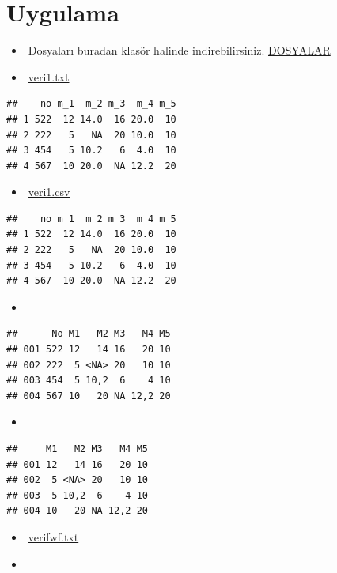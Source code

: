 \documentclass[
  oneside]{book}
\providecommand{\tightlist}{%
  \setlength{\itemsep}{0pt}\setlength{\parskip}{0pt}}
\begin{document}
\hypertarget{uygulama}{%
\section{Uygulama}\label{uygulama}}

\begin{itemize}
\item
  🔗Dosyaları buradan klasör halinde indirebilirsiniz. \href{import/import.rar}{DOSYALAR}
\item
  🔗\href{import/veri1.txt}{veri1.txt}
\end{itemize}

\begin{verbatim}
##    no m_1  m_2 m_3  m_4 m_5
## 1 522  12 14.0  16 20.0  10
## 2 222   5   NA  20 10.0  10
## 3 454   5 10.2   6  4.0  10
## 4 567  10 20.0  NA 12.2  20
\end{verbatim}

\begin{itemize}
\tightlist
\item
  🔗\href{import/veri1.csv}{veri1.csv}
\end{itemize}

\begin{verbatim}
##    no m_1  m_2 m_3  m_4 m_5
## 1 522  12 14.0  16 20.0  10
## 2 222   5   NA  20 10.0  10
## 3 454   5 10.2   6  4.0  10
## 4 567  10 20.0  NA 12.2  20
\end{verbatim}

\begin{itemize}
\tightlist
\item
\end{itemize}

\begin{verbatim}
##      No M1   M2 M3   M4 M5
## 001 522 12   14 16   20 10
## 002 222  5 <NA> 20   10 10
## 003 454  5 10,2  6    4 10
## 004 567 10   20 NA 12,2 20
\end{verbatim}

\begin{itemize}
\tightlist
\item
\end{itemize}

\begin{verbatim}
##     M1   M2 M3   M4 M5
## 001 12   14 16   20 10
## 002  5 <NA> 20   10 10
## 003  5 10,2  6    4 10
## 004 10   20 NA 12,2 20
\end{verbatim}

\begin{itemize}
\tightlist
\item
  🔗\href{import/fwf.txt}{verifwf.txt}
\item
\end{itemize}
\end{document}
